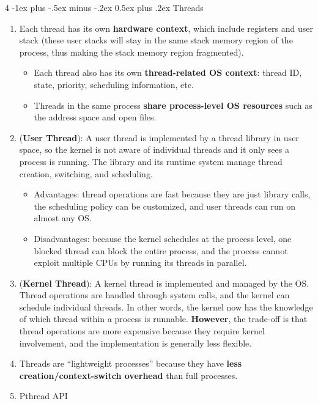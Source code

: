 \documentclass[10pt, landscape]{article}
\makeatletter
\renewcommand{\section}{\@startsection{section}{1}{0mm}%
                                {-1ex plus -.5ex minus -.2ex}%
                                {0.5ex plus .2ex}%
                                {\normalfont\large\bfseries}}
\makeatother
\begin{document}
\begin{multicols}{4}
\section{Threads}
\begin{enumerate}
    \item Each thread has its own \textbf{hardware context}, which include registers and user stack (these user stacks will stay in the same stack memory region of the process, thus making the stack memory region fragmented).
    \begin{itemize}
        \item Each thread also has its own \textbf{thread-related OS context}: thread ID, state, priority, scheduling information, etc.
        \item Threads in the same process \textbf{share process-level OS resources} such as the address space and open files.
    \end{itemize}
    \item (\textbf{User Thread}): A user thread is implemented by a thread library in user space, so the kernel is not aware of individual threads and it only sees a process is running. The library and its runtime system manage thread creation, switching, and scheduling.
    \begin{itemize}
        \item Advantages: thread operations are fast because they are just library calls, the scheduling policy can be customized, and user threads can run on almost any OS.
        \item Disadvantages: because the kernel schedules at the process level, one blocked thread can block the entire process, and the process cannot exploit multiple CPUs by running its threads in parallel.
    \end{itemize}
    \item (\textbf{Kernel Thread}): A kernel thread is implemented and managed by the OS. Thread operations are handled through system calls, and the kernel can schedule individual threads. In other words, the kernel now has the knowledge of which thread within a process is runnable. \textbf{However}, the trade-off is that thread operations are more expensive because they require kernel involvement, and the implementation is generally less flexible.
    \item Threads are ``lightweight processes'' because they have \textbf{less creation/context-switch overhead} than full processes.
    \item Pthread API
        \begin{itemize}

\end{itemize}
\end{enumerate}
\end{multicols}
\end{document}
